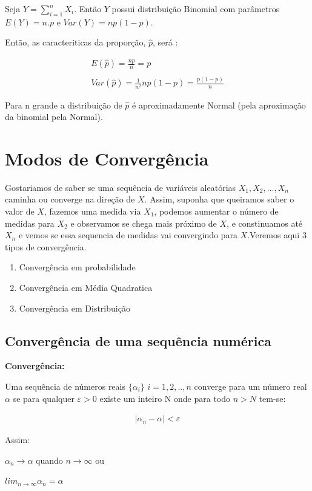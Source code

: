 \documentclass[
  letterpaper,
  DIV=11,
  numbers=noendperiod]{scrartcl}
\begin{document}
Seja \(Y=\sum_{i=1}^{n} X_i\). Então \(Y\) possui distribuição Binomial
com parâmetros \(E(Y)=n.p\) e \(Var(Y)=np(1-p)\).

Então, as caracteriticas da proporção, \(\hat{p}\), será :

\[\begin{array}{ccc}
 E(\hat{p})= \frac{n p}{n} = p
 \\
 \\
 Var(\hat{p})= \frac{1}{n^{2}} n p (1-p)= \frac{p(1-p)}{n}
\end{array}\]

Para n grande a distribuição de \(\hat{p}\) é aproximadamente Normal
(pela aproximação da binomial pela Normal).

\section{Modos de Convergência}\label{modos-de-converguxeancia}

Gostariamos de saber se uma sequência de variáveis aleatórias
\(X_1,X_2,...,X_n\) caminha ou converge na direção de \(X\). Assim,
suponha que queiramos saber o valor de \(X\), fazemos uma medida via
\(X_1\), podemos aumentar o número de medidas para \(X_2\) e observamos
se chega mais próximo de \(X\), e constinuamos até \(X_n\) e vemos se
essa sequencia de medidas vai convergindo para \(X\).Veremos aqui 3
tipos de convergência.

\begin{enumerate}
 \item Convergência em probabilidade
 \item Convergência em Média Quadratica
 \item Convergência em Distribuição
\end{enumerate}

\subsection{Convergência de uma sequência
numérica}\label{converguxeancia-de-uma-sequuxeancia-numuxe9rica}

\begin{definicao}

\textbf{Convergência:}

Uma sequência de números reais \(\{\alpha_i\}\) \(i=1,2,..,n\) converge
para um número real \(\alpha\) se para qualquer \(\varepsilon>0\) existe
um inteiro N onde para todo \(n>N\) tem-se:

\[\begin{array}{ccc}
|\alpha_n - \alpha |<\varepsilon
\end{array}\]

Assim:

\hfill\break

\(\alpha_n \rightarrow \alpha\) quando \(n \rightarrow \infty\) ou

\hfill\break

\(lim_{n \rightarrow \infty} \alpha_n = \alpha\)

\end{definicao}
\end{document}
